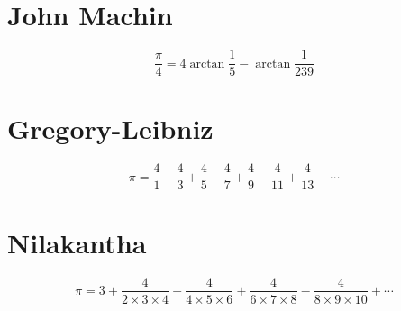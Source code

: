 \documentclass{article}
\begin{document}
\section{John Machin}

\[
\frac{\pi}{4} = 4 \arctan \frac{1}{5} - \arctan \frac{1}{239}
\]


\section{Gregory-Leibniz}

\[
\pi = 
\frac{4}{1} -
\frac{4}{3} +
\frac{4}{5} -
\frac{4}{7} +
\frac{4}{9} -
\frac{4}{11} +
\frac{4}{13} -
\cdots
\]


\section{Nilakantha}

\[
\pi = 3 +
\frac{4}{2 \times 3 \times 4} -
\frac{4}{4 \times 5 \times 6} +
\frac{4}{6 \times 7 \times 8} -
\frac{4}{8 \times 9 \times 10} +
\cdots
\]
\end{document}
